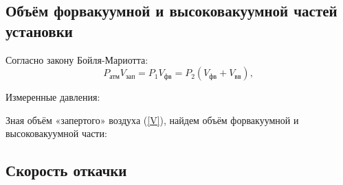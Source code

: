 \documentclass[a4paper,12pt]{article} %
\begin{document}
\begin{equation}
    
\end{equation}
\begin{equation}
    
\end{equation}
\begin{equation}
    
\end{equation}
\begin{equation}
    
\end{equation}
\begin{equation}
    
\end{equation}
\begin{equation}\label{V}
    
\end{equation}
\begin{equation}
    
\end{equation}
\begin{equation}
    
\end{equation}

\subsection*{Объём форвакуумной и высоковакуумной частей установки}

Согласно закону Бойля-Мариотта:
\begin{equation}
	P_{атм}V_{зап}=P_1V_{фв}=P_2(V_{фв}+V_{вв}),
\end{equation}

Измеренные давления:
\begin{equation}
	
\end{equation}
\begin{equation}
	
\end{equation}

Зная объём «запертого» воздуха (\ref{V}), найдем объём форвакуумной и высоковакуумной части:
\begin{equation}
	
\end{equation}
\begin{equation}
	
\end{equation}

\subsection*{Скорость откачки}
\end{document}

